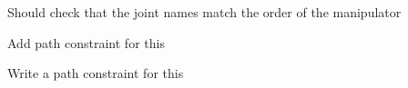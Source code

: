 \begin{DoxyRefList}
\label{todo__todo000030}%
%
Should check that the joint names match the order of the manipulator 

\label{todo__todo000029}%
%
Add path constraint for this 

\label{todo__todo000028}%
%
Write a path constraint for this 
\end{DoxyRefList}